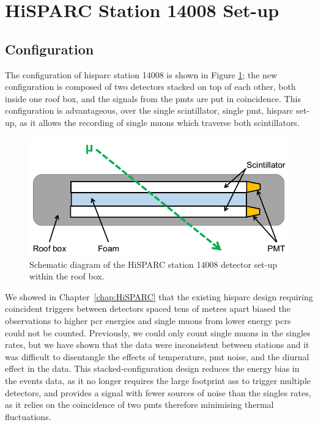 \section{HiSPARC Station 14008 Set-up}\label{sec:HiSPARC_14008}


\subsection{Configuration}

The configuration of \gls{hisparc} station 14008 is shown in Figure \ref{fig:14008_config}; the new configuration is composed of two detectors stacked on top of each other, both inside one roof box, and the signals from the \glspl{pmt} are put in coincidence. This configuration is advantageous, over the single scintillator, single \gls{pmt}, \gls{hisparc} set-up, as it allows the recording of single muons which traverse both scintillators. 


\begin{figure}[ht!]
	\center
	\includegraphics[width=0.75\columnwidth]{14008_config.png}
	\caption{Schematic diagram of the HiSPARC station 14008 detector set-up within the roof box.}
	\label{fig:14008_config}
\end{figure}

We showed in Chapter~\ref{chap:HiSPARC} that the existing \gls{hisparc} design requiring coincident triggers between detectors spaced tens of metres apart biased the observations to higher \gls{pcr} energies and single muons from lower energy \glspl{pcr} could not be counted. Previously, we could only count single muons in the singles rates, but we have shown that the data were inconsistent between stations and it was difficult to disentangle the effects of temperature, \gls{pmt} noise, and the diurnal effect in the data. This stacked-configuration design reduces the energy bias in the events data, as it no longer requires the large footprint \glspl{as} to trigger multiple detectors, and provides a signal with fewer sources of noise than the singles rates, as it relies on the coincidence of two \glspl{pmt} therefore minimising thermal fluctuations.


